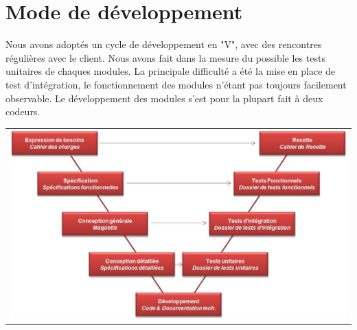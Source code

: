 \section{Mode de développement}

Nous avons adoptés un cycle de développement en "V", avec des rencontres régulières avec le client. Nous avons fait dans la mesure du possible les tests unitaires de chaques modules. La principale difficulté a été la mise en place de test d'intégration, le fonctionnement des modules n'étant pas toujours facilement observable. Le développement des modules s'est pour la plupart fait à deux codeurs.

\begin{tabular}{c}
\includegraphics[width=140mm]{Images/Cycle_en_V.jpg}
\end{tabular}

